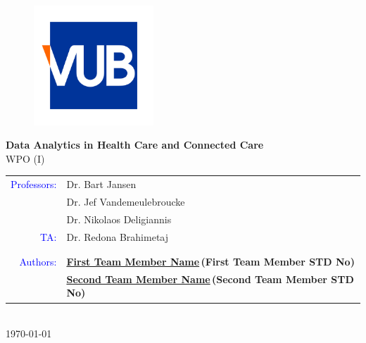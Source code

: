 \documentclass[11pt]{article}
\newcommand{\courseName}{Data Analytics in Health Care and Connected Care}
\newcommand{\assignmentName}{WPO (I)}
\newcommand{\courseProfessorFirst}{Dr. Bart Jansen}
\newcommand{\courseProfessorSecond}{Dr. Jef Vandemeulebroucke}
\newcommand{\courseProfessorThird}{Dr. Nikolaos Deligiannis}
\newcommand{\taNameFirst}{Dr. Redona Brahimetaj}
\newcommand{\taNameSecond}{}
\newcommand{\taNameThird}{}
\newcommand{\teamMemberFirst}{First Team Member Name}
\newcommand{\teamMemberFirstStdNo}{(First Team Member STD No)}
\newcommand{\teamMemberFirstEmail}{\href{mailto: First Team Member Email}{\teamMemberFirst}}
\newcommand{\teamMemberSecond}{Second Team Member Name}
\newcommand{\teamMemberSecondStdNo}{(Second Team Member STD No)}
\newcommand{\teamMemberSecondEmail}{\href{mailto: Second Team Member Email}{\teamMemberSecond}}
\newcommand{\writingMonth}{\monthyeardate\today}
\begin{document}
%
%
\thispagestyle{empty}
 \begin{center}


\begin{figure}[H]
\centering
\includegraphics[width=0.4\textwidth]{VUB_Logo.jpg}
\caption*{}
\label{f-0-0}
\end{figure}
{
\centering
{}  
\fontsize{20pt}{20pt}
\selectfont 
\textbf{\courseName}
}
\\[20pt]
{
\centering
{}  
\fontsize{16pt}{16pt}
\selectfont 
\assignmentName
}
\\[20pt]
{
\centering
{}  
\fontsize{12pt}{12pt}
\selectfont 
\begin{tabular}{r l}
\textcolor{blue}{Professors:}			&	\courseProfessorFirst\\[7pt]
							&	\courseProfessorSecond\\[7pt]
							&	\courseProfessorThird\\[7pt]
\textcolor{blue}{TA:}				&	\taNameFirst\\[7pt]
							&	\taNameSecond\\[7pt]
							&	\taNameThird\\[7pt]
\textcolor{blue}{Authors:}			&  	\textbf{\teamMemberFirstEmail \,\teamMemberFirstStdNo}\\[7pt]
							&	\textbf{\teamMemberSecondEmail \,\teamMemberSecondStdNo}\\[7pt]
 
\end{tabular}
}
\\[20pt]
{
\centering
{}  
\fontsize{12pt}{12pt}
\selectfont 
\writingMonth
}

\end{center}
 

 
\setmainfont{Times New Roman}
\newpage
\end{document}
